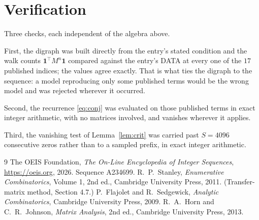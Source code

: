 \documentclass[11pt,a4paper]{article}
\theoremstyle{plain}
\theoremstyle{definition}
\begin{document}
\section{Verification}

Three checks, each independent of the algebra above.

First, the digraph was built directly from the entry's stated condition and the walk counts
$\mathbf{1}^{\!\top}M^{n}\mathbf{1}$ compared against the entry's DATA at every one of
the $17$ published indices; the values agree exactly. That is what ties the digraph to
the sequence: a model reproducing only some published terms would be the wrong model and
was rejected wherever it occurred.

Second, the recurrence \eqref{eq:conj} was evaluated on those published terms in exact
integer arithmetic, with no matrices involved, and vanishes wherever it applies.

Third, the vanishing test of Lemma~\ref{lem:crit} was carried past $S=4096$ consecutive
zeros rather than to a sampled prefix, in exact integer arithmetic.

\begin{thebibliography}{9}
 The OEIS Foundation, \emph{The On-Line Encyclopedia of Integer
Sequences}, \url{https://oeis.org}, 2026. Sequence A234699.
 R.~P.~Stanley, \emph{Enumerative Combinatorics}, Volume 1, 2nd ed.,
Cambridge University Press, 2011. (Transfer-matrix method, Section 4.7.)
 P.~Flajolet and R.~Sedgewick, \emph{Analytic Combinatorics}, Cambridge
University Press, 2009.
 R.~A.~Horn and C.~R.~Johnson, \emph{Matrix Analysis}, 2nd ed., Cambridge
University Press, 2013.
\end{thebibliography}
\end{document}
